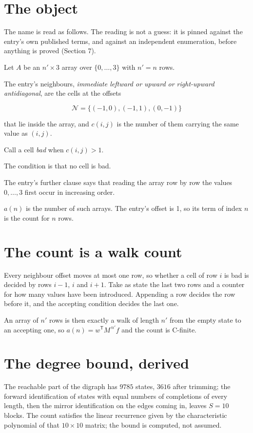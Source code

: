 \documentclass[11pt]{article}
\theoremstyle{definition}
\begin{document}
\section{The object}

The name is read as follows. The reading is not a guess: it is pinned against the entry's own published terms, and against an independent enumeration, before anything is proved (Section 7).

Let $A$ be an $n' \times 3$ array over $\{0,\dots,3\}$ with $n' = n$ rows.

The entry's neighbours, {\itshape immediate leftward or upward or right-upward antidiagonal}, are the cells at the offsets

\[\mathcal{N} = \{(-1,0), (-1,1), (0,-1)\}\]

that lie inside the array, and $c(i,j)$ is the number of them carrying the same value as $(i,j)$.

Call a cell {\itshape bad} when $c(i,j) > 1$.

The condition is that no cell is bad.

The entry's further clause says that reading the array row by row the values $0,\dots,3$ first occur in increasing order.

$a(n)$ is the number of such arrays. The entry's offset is 1, so its term of index $n$ is the count for $n$ rows.

\section{The count is a walk count}

Every neighbour offset moves at most one row, so whether a cell of row $i$ is bad is decided by rows $i-1$, $i$ and $i+1$. Take as state the last two rows and a counter for how many values have been introduced. Appending a row decides the row before it, and the accepting condition decides the last one.

An array of $n'$ rows is then exactly a walk of length $n'$ from the empty state to an accepting one, so $a(n) = w^{\mathsf T}M^{\,n'}f$ and the count is C-finite.

\section{The degree bound, derived}

The reachable part of the digraph has $9785$ states, $3616$ after trimming; the forward identification of states with equal numbers of completions of every length, then the mirror identification on the edges coming in, leaves $S = 10$ blocks. The count satisfies the linear recurrence given by the characteristic polynomial of that $10\times10$ matrix; the bound is computed, not assumed.
\end{document}
